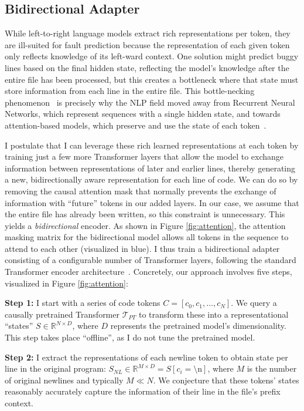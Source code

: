 \documentclass[12pt,openany,oneside,table]{cmuthesis}
\begin{document}
\subsection{Bidirectional Adapter}
\label{sec:adapter}
While left-to-right language models extract rich representations per token, they are ill-suited for fault prediction because the representation of each given token only reflects knowledge of its left-ward context. One solution might predict buggy lines based on the final hidden state, reflecting the model's knowledge after the entire file has been processed, but this creates a bottleneck where that state must store information from each line in the entire file. This bottle-necking phenomenon~\cite{bengio1994learning} is precisely why the NLP field moved away from Recurrent Neural Networks, which represent sequences with a single hidden state, and towards attention-based models, which preserve and use the state of each token~\cite{vaswani2017attention}.

I postulate that I can leverage these rich learned representations at each token by training just a few more Transformer layers that allow the model to exchange information between representations of later and earlier lines, thereby generating a new, bidirectionally aware representation for each line of code. We can do so by removing the causal attention mask that normally prevents the exchange of information with ``future'' tokens in our added layers. In our case, we assume that the entire file has already been written, so this constraint is unnecessary.
This yields a \textit{bidirectional} encoder. As shown in Figure \ref{fig:attention}, the attention masking matrix for the bidirectional model allows all tokens in the sequence to attend to each other (visualized in blue).
I thus train a bidirectional adapter consisting of a configurable number of Transformer layers, following the standard Transformer encoder architecture~\cite{vaswani2017attention}. Concretely, our approach involves five steps, visualized in Figure \ref{fig:attention}:

\textbf{Step 1:} I start with a series of code tokens $C = [c_0, c_1, \ldots, c_N]$. We query a causally pretrained Transformer $\mathcal{T}_{PT}$ to transform these into a representational ``states'' $S \in \mathbb{R}^{N \times D}$, where $D$ represents the pretrained model's dimensionality. This step takes place ``offline'', as I do not tune the pretrained model. 

\textbf{Step 2:} I extract the representations of each newline token to obtain state per line in the original program: $S_{NL} \in \mathbb{R}^{M \times D} = S[c_i=\text{\textbackslash n}]$, where $M$ is the number of original newlines and typically $M \ll N$. We conjecture that these tokens' states reasonably accurately capture the information of their line in the file's prefix context.
\end{document}
